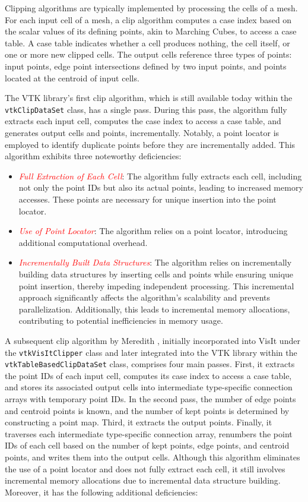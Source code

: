 \documentclass{egpubl}
\newcommand*{\fix}[1]{\textcolor{red}{#1}}
\begin{document}
Clipping algorithms are typically implemented by processing the cells of a mesh. For each input cell of a mesh, a clip algorithm computes a case index based on the scalar values of its defining points, akin to Marching Cubes, to access a case table. A case table indicates whether a cell produces nothing, the cell itself, or one or more new clipped cells. The output cells reference three types of points: input points, edge point intersections defined by two input points, and points located at the centroid of input cells.

The VTK library's \cite{VTK} first clip algorithm, which is still available today within the \texttt{vtkClipDataSet} class, has a single pass. During this pass, the algorithm fully extracts each input cell, computes the case index to access a case table, and generates output cells and points, incrementally. Notably, a point locator is employed to identify duplicate points before they are incrementally added. This algorithm exhibits three noteworthy deficiencies:

\begin{itemize}
    \item \fix{\textit{Full Extraction of Each Cell}}: The algorithm fully extracts each cell, including not only the point IDs but also its actual points, leading to increased memory accesses. These points are necessary for unique insertion into the point locator.
    \item \fix{\textit{Use of Point Locator}}: The algorithm relies on a point locator, introducing additional computational overhead.
    \item \fix{\textit{Incrementally Built Data Structures}}: The algorithm relies on incrementally building data structures by inserting cells and points while ensuring unique point insertion, thereby impeding independent processing. This incremental approach significantly affects the algorithm's scalability and prevents parallelization. Additionally, this leads to incremental memory allocations, contributing to potential inefficiencies in memory usage.
\end{itemize}

A subsequent clip algorithm by Meredith \cite{Clip}, initially incorporated into VisIt \cite{VisIt} under the \texttt{vtkVisItClipper} class and later integrated into the VTK library within the \texttt{vtkTableBasedClipDataSet} class, comprises four main passes.
First, it extracts the point IDs of each input cell, computes its case index to access a case table, and stores its associated output cells into intermediate type-specific connection arrays with temporary point IDs. In the second pass, the number of edge points and centroid points is known, and the number of kept points is determined by constructing a point map. Third, it extracts the output points. Finally, it traverses each intermediate type-specific connection array, renumbers the point IDs of each cell based on the number of kept points, edge points, and centroid points, and writes them into the output cells. Although this algorithm eliminates the use of a point locator and does not fully extract each cell, it still involves incremental memory allocations due to incremental data structure building. Moreover, it has the following additional deficiencies:
\end{document}
